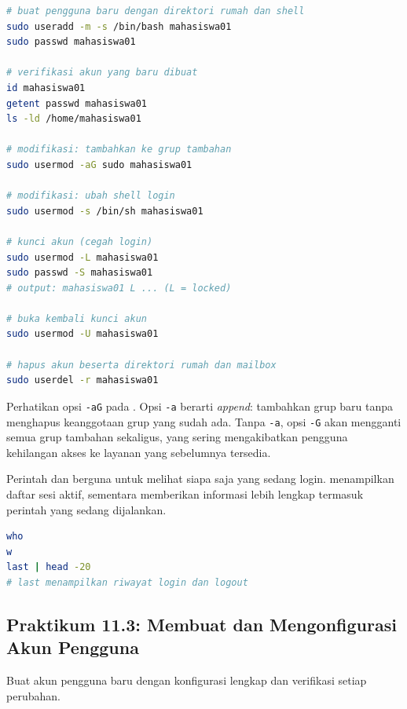 \begin{lstlisting}[language=bash, caption={Siklus hidup akun pengguna}]
# buat pengguna baru dengan direktori rumah dan shell
sudo useradd -m -s /bin/bash mahasiswa01
sudo passwd mahasiswa01

# verifikasi akun yang baru dibuat
id mahasiswa01
getent passwd mahasiswa01
ls -ld /home/mahasiswa01

# modifikasi: tambahkan ke grup tambahan
sudo usermod -aG sudo mahasiswa01

# modifikasi: ubah shell login
sudo usermod -s /bin/sh mahasiswa01

# kunci akun (cegah login)
sudo usermod -L mahasiswa01
sudo passwd -S mahasiswa01
# output: mahasiswa01 L ... (L = locked)

# buka kembali kunci akun
sudo usermod -U mahasiswa01

# hapus akun beserta direktori rumah dan mailbox
sudo userdel -r mahasiswa01
\end{lstlisting}

Perhatikan opsi \texttt{-aG} pada . Opsi \texttt{-a} berarti \textit{append}: tambahkan grup baru tanpa menghapus keanggotaan grup yang sudah ada. Tanpa \texttt{-a}, opsi \texttt{-G} akan mengganti semua grup tambahan sekaligus, yang sering mengakibatkan pengguna kehilangan akses ke layanan yang sebelumnya tersedia.

Perintah  dan  berguna untuk melihat siapa saja yang sedang login.  menampilkan daftar sesi aktif, sementara  memberikan informasi lebih lengkap termasuk perintah yang sedang dijalankan.

\begin{lstlisting}[language=bash, caption={Memeriksa sesi pengguna aktif}]
who
w
last | head -20
# last menampilkan riwayat login dan logout
\end{lstlisting}

\subsection*{Praktikum 11.3: Membuat dan Mengonfigurasi Akun Pengguna}

Buat akun pengguna baru dengan konfigurasi lengkap dan verifikasi setiap perubahan.

